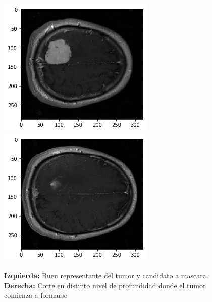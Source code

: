 \documentclass[conference]{IEEEtran}
\begin{document}
\begin{figure}
\begin{center}
\includegraphics[scale=0.4]{img/tumor_brain.png} 
\includegraphics[scale=0.4]{img/tumor_brain_2.png} 
\end{center}
\caption{\textbf{Izquierda:} Buen representante del tumor y candidato a mascara. \textbf{Derecha:} Corte en distinto nivel de profundidad donde el tumor comienza a formarse}
\end{figure}
\end{document}

